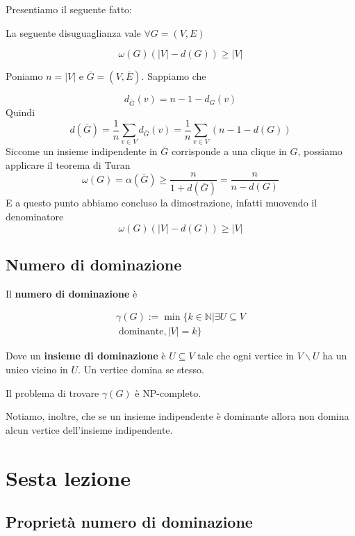 \documentclass[12pt]{report}
\begin{document}
\noindent 
Presentiamo il seguente fatto:

\begin{fatto}
    La seguente disuguaglianza vale $\forall G = (V,E)$

    $$ \omega(G) (|V| - d(G)) \geq |V|$$
\end{fatto}

\begin{dimo}
    Poniamo $n = |V|$ e $\bar G = (V,\bar E)$. Sappiamo che 

    $$d_{\bar G} (v) = n - 1 - d_G(v)$$
    Quindi
    $$d(\bar G) = \frac{1}{n} \sum_{v \in V} d_{\bar G}(v) = \frac{1}{n} \sum_{v \in V} (n - 1 - d(G))$$
    Siccome un insieme indipendente  in $\bar G$ corrisponde a una clique in $G$, possiamo applicare il teorema di Turan 
    $$\omega(G) = \alpha(\bar G) \geq \frac{n}{1 + d(\bar G)} = \frac{n}{n - d(G)} $$
    E a questo punto abbiamo concluso la dimostrazione, infatti muovendo il denominatore
    $$\omega(G) (|V| - d(G)) \geq |V|$$
\end{dimo}

\section{Numero di dominazione}

\begin{defi}
    Il \textbf{numero di dominazione} è 

    \begin{multline*}
    \gamma(G):= \min\{k \in \mathbb{N} | \exists U \subseteq V\\ \; \text{dominante}, |V| = k\} 
    \end{multline*}
\end{defi}
\noindent 
Dove un \textbf{insieme di dominazione} è $U \subseteq V$ tale che ogni vertice in $V \backslash U$ ha un unico vicino in $U$. Un vertice domina se stesso.

Il problema di trovare $\gamma(G)$ è NP-completo.

Notiamo, inoltre, che se un insieme indipendente è dominante allora non domina alcun vertice dell'insieme indipendente.

\chapter{Sesta lezione}

\section{Proprietà numero di dominazione}
\end{document}
